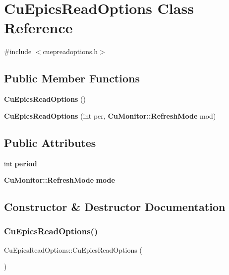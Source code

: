 \section{Cu\+Epics\+Read\+Options Class Reference}
\label{classCuEpicsReadOptions}


{\ttfamily \#include $<$cuepreadoptions.\+h$>$}

\subsection*{Public Member Functions}
\begin{DoxyCompactItemize}
\item 
\textbf{ Cu\+Epics\+Read\+Options} ()
\item 
\textbf{ Cu\+Epics\+Read\+Options} (int per, \textbf{ Cu\+Monitor\+::\+Refresh\+Mode} mod)
\end{DoxyCompactItemize}
\subsection*{Public Attributes}
\begin{DoxyCompactItemize}
\item 
int \textbf{ period}
\item 
\textbf{ Cu\+Monitor\+::\+Refresh\+Mode} \textbf{ mode}
\end{DoxyCompactItemize}


\subsection{Constructor \& Destructor Documentation}
\mbox{\label{classCuEpicsReadOptions_a5dbf0709cac6c214535b27393ff497d2}} 
\subsubsection{Cu\+Epics\+Read\+Options()\hspace{0.1cm}{\footnotesize\ttfamily [1/2]}}
{\footnotesize\ttfamily Cu\+Epics\+Read\+Options\+::\+Cu\+Epics\+Read\+Options (\begin{DoxyParamCaption}{ }\end{DoxyParamCaption})}



